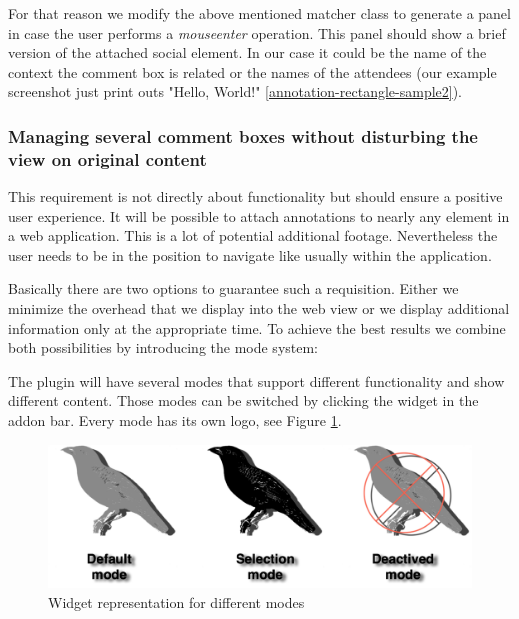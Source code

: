 For that reason we modify the above mentioned matcher class to generate a panel in case the user performs a \emph{mouseenter} operation. This panel should show a brief version of the attached social element. In our case it could be the name of the context the comment box is related or the names of the attendees (our example screenshot just print outs "Hello, World!" \ref{annotation-rectangle-sample2}). 

\subsubsection{Managing several comment boxes without disturbing the view on original content}\label{user-disturbance}

This requirement is not directly about functionality but should ensure a positive user experience. It will be possible to attach annotations to nearly any element in a web application. This is a lot of potential additional footage. Nevertheless the user needs to be in the position to navigate like usually within the application. 

Basically there are two options to guarantee such a requisition. Either we minimize the overhead that we display into the web view or we display additional information only at the appropriate time. To achieve the best results we combine both possibilities by introducing the mode system:

The plugin will have several modes that support different functionality and show different content. Those modes can be switched by clicking the widget in the addon bar. Every mode has its own logo, see Figure \ref{mode-logos}. 

\begin{figure}[h!] \centering
		\includegraphics[width=13cm]{images/mode-logos.png}
		\caption{Widget representation for different modes}
		\label{mode-logos}
\end{figure} 

